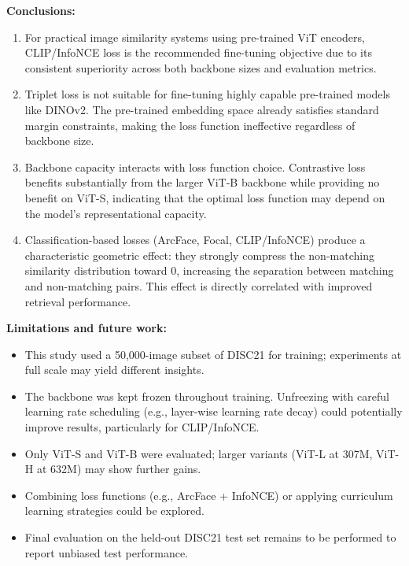 \documentclass[
    english,
]{VUMIFPSbakalaurinis}
\begin{document}
\textbf{Conclusions:}
\begin{enumerate}
    \item For practical image similarity systems using pre-trained ViT encoders, CLIP/InfoNCE loss is the recommended fine-tuning objective due to its consistent superiority across both backbone sizes and evaluation metrics.

    \item Triplet loss is not suitable for fine-tuning highly capable pre-trained models like DINOv2. The pre-trained embedding space already satisfies standard margin constraints, making the loss function ineffective regardless of backbone size.

    \item Backbone capacity interacts with loss function choice. Contrastive loss benefits substantially from the larger ViT-B backbone while providing no benefit on ViT-S, indicating that the optimal loss function may depend on the model's representational capacity.

    \item Classification-based losses (ArcFace, Focal, CLIP/InfoNCE) produce a characteristic geometric effect: they strongly compress the non-matching similarity distribution toward 0, increasing the separation between matching and non-matching pairs. This effect is directly correlated with improved retrieval performance.
\end{enumerate}

\textbf{Limitations and future work:}
\begin{itemize}
    \item This study used a 50,000-image subset of DISC21 for training; experiments at full scale may yield different insights.
    \item The backbone was kept frozen throughout training. Unfreezing with careful learning rate scheduling (e.g., layer-wise learning rate decay) could potentially improve results, particularly for CLIP/InfoNCE.
    \item Only ViT-S and ViT-B were evaluated; larger variants (ViT-L at 307M, ViT-H at 632M) may show further gains.
    \item Combining loss functions (e.g., ArcFace + InfoNCE) or applying curriculum learning strategies could be explored.
    \item Final evaluation on the held-out DISC21 test set remains to be performed to report unbiased test performance.
\end{itemize}
\end{document}
